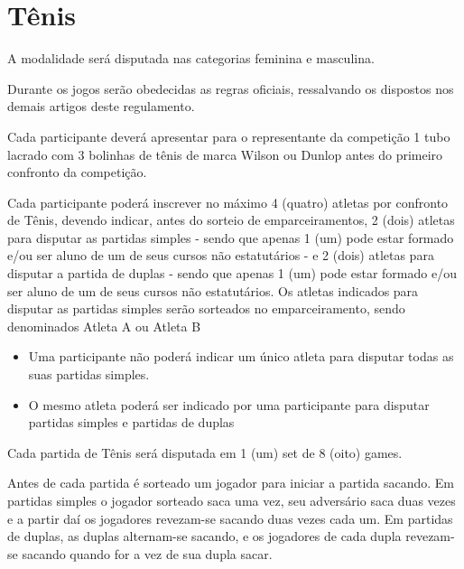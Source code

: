 {\let\clearpage\relax \chapter{Tênis}}

\begin{article}
	A modalidade será disputada nas categorias feminina e masculina.
\end{article}

\begin{article}
	Durante os jogos serão obedecidas as regras oficiais, ressalvando os dispostos nos demais artigos deste regulamento.
\end{article}

\begin{article}
	Cada participante deverá apresentar para o representante da competição 1 tubo lacrado com 3 bolinhas de tênis de marca Wilson ou Dunlop antes do primeiro confronto da competição.
\end{article}

\begin{article}
	Cada participante poderá inscrever no máximo 4 (quatro) atletas por confronto de Tênis, devendo indicar, antes do sorteio de emparceiramentos, 2 (dois) atletas para disputar as partidas simples - sendo que apenas 1 (um) pode estar formado e/ou ser aluno de um de seus cursos não estatutários - e 2 (dois) atletas para disputar a partida de duplas - sendo que apenas 1 (um) pode estar formado e/ou ser aluno de um de seus cursos não estatutários. Os atletas indicados para disputar as partidas simples serão sorteados no emparceiramento, sendo denominados Atleta A ou Atleta B

	\begin{itemize}[noitemsep]
		\item Uma participante não poderá indicar um único atleta para disputar todas as suas partidas simples.
		\item O mesmo atleta poderá ser indicado por uma participante para disputar partidas simples e partidas de duplas
	\end{itemize}

	Cada partida de Tênis será disputada em 1 (um) set de 8 (oito) games.
\end{article}

\noindent
Antes de cada partida é sorteado um jogador para iniciar a partida sacando. Em partidas simples o jogador sorteado saca uma vez, seu adversário saca duas vezes e a partir daí os jogadores revezam-se sacando duas vezes cada um. Em partidas de duplas, as duplas alternam-se sacando, e os jogadores de cada dupla revezam-se sacando quando for a vez de sua dupla sacar.

